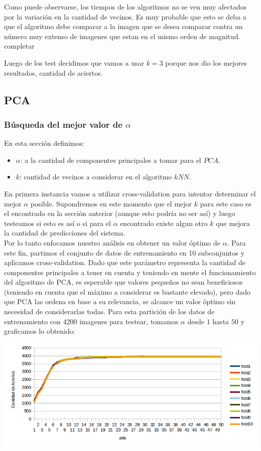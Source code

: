Como puede observarse, los tiempos de los algoritmos no se ven muy afectados por la variación en la cantidad de vecinos. Es muy probable que esto se deba a que el algoritmo debe comparar a la imagen que se desea comparar contra un número muy extenso de imagenes que estan en el mismo orden de magnitud. 
completar

Luego de los test decidimos que vamos a usar $k=3$ porque nos dio los mejores resultados, cantidad de aciertos.

\subsection{PCA}
\subsubsection{Búsqueda del mejor valor de $\alpha$}
En esta sección definimos:
\begin{itemize}
	\item $\alpha$: a la cantidad de componentes principales a tomar para el $PCA$.
	\item $k$: cantidad de vecinos a considerar en el algoritmo $kNN$.
\end{itemize}
En primera instancia vamos a utilizar cross-validation para intentar determinar el mejor $\alpha$ posible. Supondremos en este momento que el mejor $k$ para este caso es el encontrado en la sección anterior (aunque esto podría no ser así) y luego testeamos si esto es así o si para el $\alpha$ encontrado existe algun otro $k$ que mejora la cantidad de predicciones del sistema.
\\
Por lo tanto enfocamos nuestro análisis en obtener un valor óptimo de $\alpha$. Para este fin, partimos el conjunto de datos de entrenamiento en 10 subconjuntos y aplicamos cross-validation. Dado que este parámetro representa la cantidad de componentes principales a tener en cuenta y teniendo en mente el funcionamiento del algoritmo de PCA, es esperable que valores pequeños no sean beneficiosos (teniendo en cuenta que el máximo a considerar es bastante elevado), pero dado que PCA las ordena en base a su relevancia, se alcance un valor óptimo sin necesidad de considerarlas todas. Para esta partición de los datos de entrenamiento con 4200 imagenes para testear, tomamos $\alpha$ desde $1$ hasta $50$ y graficamos lo obtenido:

\begin{center}
\includegraphics[scale=0.6]{nuevosResultados/pca/alfa/1.png}
\end{center}

